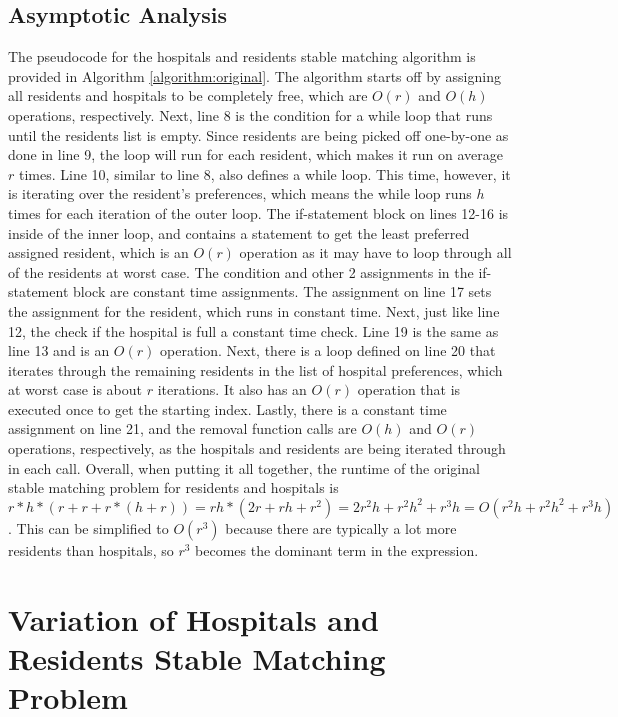 \documentclass[letterpaper, 10pt,DIV=13]{scrartcl}
\numberwithin{equation}{section} %
\numberwithin{figure}{section} %
\numberwithin{table}{section} %
\begin{document}
\subsection{Asymptotic Analysis}
The pseudocode for the hospitals and residents stable matching algorithm is provided in Algorithm \ref{algorithm:original}. The algorithm starts off by assigning all residents and hospitals to be completely free, which are $O(r)$ and $O(h)$ operations, respectively. Next, line 8 is the condition for a while loop that runs until the residents list is empty. Since residents are being picked off one-by-one as done in line 9, the loop will run for each resident, which makes it run on average $r$ times. Line 10, similar to line 8, also defines a while loop. This time, however, it is iterating over the resident's preferences, which means the while loop runs $h$ times for each iteration of the outer loop. The if-statement block on lines 12-16 is inside of the inner loop, and contains a statement to get the least preferred assigned resident, which is an $O(r)$ operation as it may have to loop through all of the residents at worst case. The condition and other 2 assignments in the if-statement block are constant time assignments. The assignment on line 17 sets the assignment for the resident, which runs in constant time. Next, just like line 12, the check if the hospital is full a constant time check. Line 19 is the same as line 13 and is an $O(r)$ operation. Next, there is a loop defined on line 20 that iterates through the remaining residents in the list of hospital preferences, which at worst case is about $r$ iterations. It also has an $O(r)$ operation that is executed once to get the starting index. Lastly, there is a constant time assignment on line 21, and the removal function calls are $O(h)$ and $O(r)$ operations, respectively, as the hospitals and residents are being iterated through in each call. Overall, when putting it all together, the runtime of the original stable matching problem for residents and hospitals is $r * h * (r + r + r * (h + r)) = rh * (2r + rh + r^2) = 2r^2h + r^2h^2 + r^3h = O(r^2h + r^2h^2 + r^3h)$. This can be simplified to $O(r^3)$ because there are typically a lot more residents than hospitals, so $r^3$ becomes the dominant term in the expression. 

\section{Variation of Hospitals and Residents Stable Matching Problem}
\end{document}
